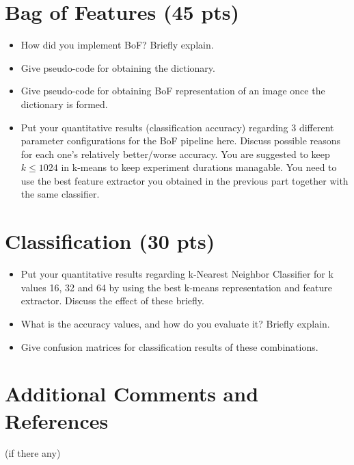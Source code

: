 \documentclass[12pt]{article}
\begin{document}
\section{Bag of Features (45 pts)}
    \begin{itemize}
        \item How did you implement BoF? Briefly explain.
        \item Give pseudo-code for obtaining the dictionary.
        \item Give pseudo-code for obtaining BoF representation of an image once the dictionary is formed. 
        \item Put your quantitative results (classification accuracy) regarding 3 different parameter configurations for the BoF pipeline here. Discuss possible reasons for each one's relatively better/worse accuracy. You are suggested to keep $k \leq 1024$ in k-means to keep experiment durations managable. You need to use the best feature extractor you obtained in the previous part together with the same classifier.
    \end{itemize}


\section{Classification (30 pts)}
    \begin{itemize}
        \item Put your quantitative results regarding k-Nearest Neighbor Classifier for k values 16, 32 and 64 by using the best k-means representation and feature extractor. Discuss the effect of these briefly.
        \item What is the accuracy values, and how do you evaluate it? Briefly explain.
        \item Give confusion matrices for classification results of these combinations.
    \end{itemize}


\section{Additional Comments and References}

    (if there any)
\end{document}
